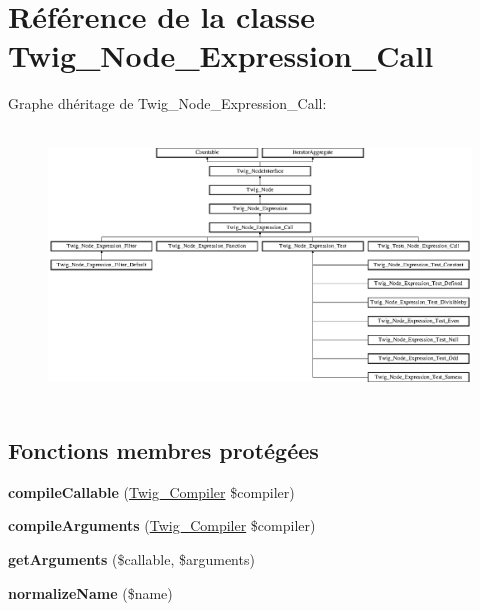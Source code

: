 \hypertarget{class_twig___node___expression___call}{}\section{Référence de la classe Twig\+\_\+\+Node\+\_\+\+Expression\+\_\+\+Call}
\label{class_twig___node___expression___call}
Graphe d\textquotesingle{}héritage de Twig\+\_\+\+Node\+\_\+\+Expression\+\_\+\+Call\+:\begin{figure}[H]
\begin{center}
\leavevmode
\includegraphics[height=7.250996cm]{class_twig___node___expression___call}
\end{center}
\end{figure}
\subsection*{Fonctions membres protégées}
\begin{DoxyCompactItemize}
\item 
{\bfseries compile\+Callable} (\hyperlink{class_twig___compiler}{Twig\+\_\+\+Compiler} \$compiler)\hypertarget{class_twig___node___expression___call_a78758d281532d246d656412c244c4ecd}{}\label{class_twig___node___expression___call_a78758d281532d246d656412c244c4ecd}

\item 
{\bfseries compile\+Arguments} (\hyperlink{class_twig___compiler}{Twig\+\_\+\+Compiler} \$compiler)\hypertarget{class_twig___node___expression___call_ab86d2b3f8c992934baab01f91e77deb2}{}\label{class_twig___node___expression___call_ab86d2b3f8c992934baab01f91e77deb2}

\item 
{\bfseries get\+Arguments} (\$callable, \$arguments)\hypertarget{class_twig___node___expression___call_a3546f967ad32236268c7e2ef810b707a}{}\label{class_twig___node___expression___call_a3546f967ad32236268c7e2ef810b707a}

\item 
{\bfseries normalize\+Name} (\$name)\hypertarget{class_twig___node___expression___call_a565b09107e424878dd2adaa4231ad84d}{}\label{class_twig___node___expression___call_a565b09107e424878dd2adaa4231ad84d}

\end{DoxyCompactItemize}
